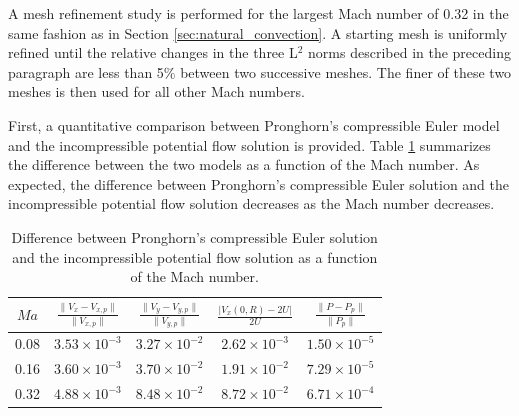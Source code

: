 A mesh refinement study is performed for the largest Mach number of 0.32 in the same fashion as in Section \ref{sec:natural_convection}. A starting mesh is uniformly refined until the relative changes in the three L$^2$ norms described in the preceding paragraph are less than 5\% between two successive meshes. The finer of these two meshes is then used for all other Mach numbers.

First, a quantitative comparison between Pronghorn's compressible Euler model and the incompressible potential flow solution is provided. Table \ref{table:MNerror} summarizes the difference between the two models as a function of the Mach number. As expected, the difference between Pronghorn's compressible Euler solution and the incompressible potential flow solution decreases as the Mach number decreases.

\begin{table}[!h]
\caption{Difference between Pronghorn's compressible Euler solution and the incompressible potential flow solution as a function of the Mach number.}
\centering
\begin{tabular}{@{}c c c c c@{}}
\toprule
{\boldmath\(Ma\)} & {\boldmath\(\frac{\|V_x-V_{x,p}\|}{\|V_{x,p}\|}\)} & {\boldmath\(\frac{\|V_y-V_{y,p}\|}{\|V_{y,p}\|}\)} & {\boldmath\(\frac{|V_{x}(0, R)-2U|}{2U}\)} & {\boldmath\(\frac{\|P-P_p\|}{\|P_p\|}\)}\\
\midrule
0.08 & \(3.53\times10^{-3}\) & \(3.27\times10^{-2}\) & \(2.62\times10^{-3}\) & \(1.50\times10^{-5}\)\\
0.16 & \(3.60\times10^{-3}\) & \(3.70\times10^{-2}\) & \(1.91\times10^{-2}\) & \(7.29\times10^{-5}\)\\
0.32 & \(4.88\times10^{-3}\) & \(8.48\times10^{-2}\) & \(8.72\times10^{-2}\) & \(6.71\times10^{-4}\)\\
\bottomrule
\end{tabular}
\label{table:MNerror}
\end{table}

